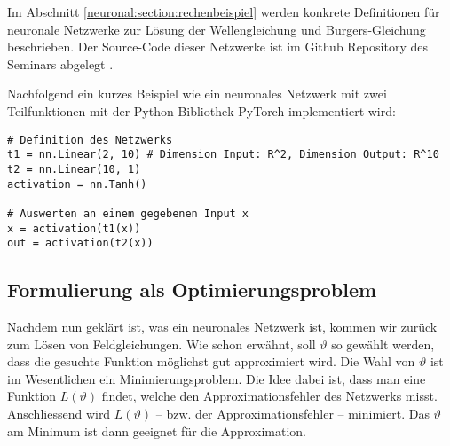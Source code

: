 Im Abschnitt \ref{neuronal:section:rechenbeispiel} werden konkrete Definitionen für neuronale Netzwerke zur Lösung der Wellengleichung und Burgers-Gleichung beschrieben.
Der Source-Code dieser Netzwerke ist im Github Repository des Seminars abgelegt \cite{neuronal:github_source_code}.

Nachfolgend ein kurzes Beispiel wie ein neuronales Netzwerk mit zwei Teilfunktionen mit der Python-Bibliothek PyTorch implementiert wird:
\begin{lstlisting}
# Definition des Netzwerks
t1 = nn.Linear(2, 10) # Dimension Input: R^2, Dimension Output: R^10
t2 = nn.Linear(10, 1)
activation = nn.Tanh()

# Auswerten an einem gegebenen Input x
x = activation(t1(x))
out = activation(t2(x))
\end{lstlisting}

\subsection{Formulierung als Optimierungsproblem}\label{neuronal:subsection:optimierungsproblem}
Nachdem nun geklärt ist, was ein neuronales Netzwerk ist, kommen wir zurück zum Lösen von Feldgleichungen.
Wie schon erwähnt, soll $\vartheta$ so gewählt werden, dass die gesuchte Funktion möglichst gut approximiert wird.
Die Wahl von $\vartheta$ ist im Wesentlichen ein Minimierungsproblem.
Die Idee dabei ist, dass man eine Funktion \( L(\vartheta) \) findet, welche den Approximationsfehler des Netzwerks misst.
Anschliessend wird $L(\vartheta)$ -- bzw. der Approximationsfehler -- minimiert.
Das $\vartheta$ am Minimum ist dann geeignet für die Approximation.

